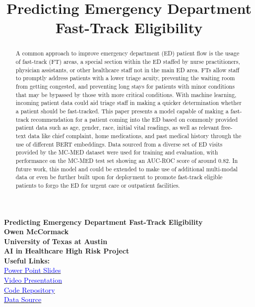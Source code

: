 \documentclass[sigconf]{acmart}
\begin{document}

\begin{titlepage}
    \centering
    {\Huge \textbf{Predicting Emergency Department Fast-Track Eligibility}}\\[1.5cm]
    {\Large \textbf{Owen McCormack}}\\[0.5cm]
    {\Large \textbf{University of Texas at Austin}}\\[0.5cm]
    {\Large \textbf{AI in Healthcare High Risk Project}}\\[2cm]
    \textbf{Useful Links:}\\[0.5cm]
    \href{https://github.com/Owenx25/UT_AiInHealthcare/blob/main/HIGH_RISK_PROJECT/HIGH_RISK_PROJECT_SLIDES.pptx}{\Large \textcolor{blue}{Power Point Slides}}\\[0.5cm]
    \href{https://utexas.hosted.panopto.com/Panopto/Pages/Viewer.aspx?id=4d6b2882-d05e-4678-8bcd-b2ca01171387}{\Large \textcolor{blue}{Video Presentation}}\\[0.5cm]
    \href{https://github.com/Owenx25/UT_AiInHealthcare/tree/main/HIGH_RISK_PROJECT}{\Large \textcolor{blue}{Code Repository}}\\[0.5cm]
    \href{https://physionet.org/content/mc-med/1.0.0/data/}{\Large \textcolor{blue}{Data Source}}\\[2cm] 
\end{titlepage}

\title{Predicting Emergency Department Fast-Track Eligibility}

\begin{abstract}
    A common approach to improve emergency department (ED) patient flow is the usage of fast-track (FT) areas, a special section within the ED staffed by nurse practitioners, physician assistants, or other healthcare staff not in the main ED area. FTs allow staff to promptly address patients with a lower triage acuity, preventing the waiting room from getting congested, and preventing long stays for patients with minor conditions that may be bypassed by those with more critical conditions. With machine learning, incoming patient data could aid triage staff in making a quicker determination whether a patient should be fast-tracked. This paper presents a model capable of making a fast-track recommendation for a patient coming into the ED based on commonly provided patient data such as age, gender, race, initial vital readings, as well as relevant free-text data like chief complaint, home medications, and past medical history through the use of different BERT embeddings. Data sourced from a diverse set of ED visits provided by the MC-MED dataset were used for training and evaluation, with performance on the MC-MED test set showing an AUC-ROC score of around 0.82. In future work, this model and could be extended to make use of additional multi-modal data or even be further built upon for deployment to promote fast-track eligible patients to forgo the ED for urgent care or outpatient facilities.
    \end{abstract}
\maketitle
\end{document}

